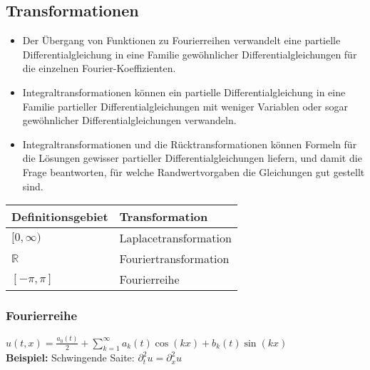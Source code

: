 \subsection{Transformationen}
\begin{itemize}
\item Der Übergang von Funktionen zu Fourierreihen verwandelt eine partielle
Differentialgleichung in eine Familie gewöhnlicher Differentialgleichungen für
die einzelnen Fourier-Koeffizienten.
\item Integraltransformationen können ein partielle Differentialgleichung in eine
Familie partieller Differentialgleichungen mit weniger Variablen oder sogar
gewöhnlicher Differentialgleichungen verwandeln.
\item Integraltransformationen und die Rücktransformationen können Formeln
für die Lösungen gewisser partieller Differentialgleichungen liefern, und
damit die Frage beantworten, für welche Randwertvorgaben die Gleichungen
gut gestellt sind.
\end{itemize}

\begin{tabular}{ll}
  Definitionsgebiet & Transformation \\
  \hline
  $[0, \infty)$ & Laplacetransformation \\
  $\mathbb{R}$ & Fouriertransformation \\
  $[- \pi, \pi]$ & Fourierreihe \\
\end{tabular}

\subsubsection{Fourierreihe}
$\boxed{u(t,x)=\frac{a_0(t)}{2}+\sum\limits_{k=1}^{\infty}{a_k(t)\cos(kx)+b_k(t)\sin(kx)}}$\\[0.4cm]

\textbf{Beispiel:} Schwingende Saite: $\boxed{\partial_t^2u=\partial_x^2u}$

